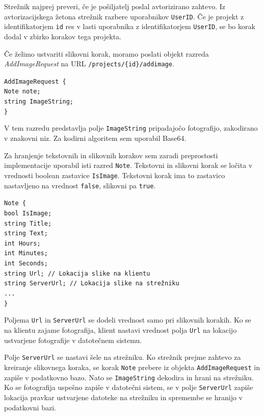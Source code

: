 \documentclass[a4paper, 12pt]{book}
\begin{document}
Strežnik najprej preveri, če je pošiljatelj poslal avtorizirano zahtevo.
Iz avtorizacijskega žetona strežnik razbere uporabnikov \texttt{UserID}. 
Če je projekt z identifikatorjem \texttt{id} res v lasti uporabnika z identifikatorjem \texttt{UserID}, se bo korak dodal v zbirko korakov tega projekta.

Če želimo ustvariti slikovni korak, moramo poslati objekt razreda \textit{AddImageRequest} na URL \texttt{/projects/\{id\}/addimage}.

\noindent \texttt{AddImageRequest \{ \\
Note note; \\
string ImageString;  \\
\} }

V tem razredu predstavlja polje \texttt{ImageString} pripadajočo fotografijo, zakodirano v znakovni niz.
Za kodirni algoritem sem uporabil Base64.

Za hranjenje tekstovnih in slikovnih korakov sem zaradi preprostosti implementacije uporabil isti razred \texttt{Note}.
Tekstovni in slikovni korak se ločita v vrednosti boolean zastavice \texttt{IsImage}.
Tekstovni korak ima to zastavico nastavljeno na vrednost \texttt{false}, slikovni pa \texttt{true}.

\noindent \texttt{Note \{ \\
bool IsImage;  \\
string Title; \\
string Text; \\
int Hours; \\
int Minutes; \\
int Seconds; \\
string Url; // Lokacija slike na klientu \\
string ServerUrl; // Lokacija slike na strežniku \\
... \\
\}
}

Poljema \texttt{Url} in \texttt{ServerUrl} se dodeli vrednost samo pri slikovnih korakih.
Ko se na klientu zajame fotografija, klient nastavi vrednost polja \texttt{Url} na lokacijo ustvarjene fotografije v datotečnem sistemu.

Polje \texttt{ServerUrl} se nastavi šele na strežniku.
Ko strežnik prejme zahtevo za kreiranje slikovnega koraka, se korak \texttt{Note} prebere iz objekta \texttt{AddImageRequest} in zapiše v podatkovno bazo.
Nato se \texttt{ImageString} dekodira in hrani na strežniku.
Ko se fotografija uspešno zapiše v datotečni sistem, se v polje \texttt{ServerUrl} zapiše lokacija pravkar ustvarjene datoteke na strežniku in spremembe se hranijo v podatkovni bazi.
\end{document}
